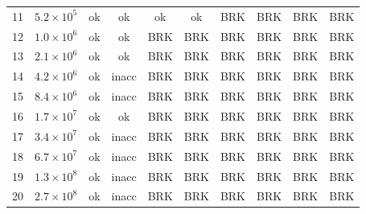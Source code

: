 \begin{tabular}{rr|cc|cc|cc|cc}
11 & $5.2\!\times\!10^{5}$ & \cellcolor{green!15}ok & \cellcolor{green!15}ok & \cellcolor{green!15}ok & \cellcolor{green!15}ok & \cellcolor{red!25}BRK & \cellcolor{red!25}BRK & \cellcolor{red!25}BRK & \cellcolor{red!25}BRK\\
12 & $1.0\!\times\!10^{6}$ & \cellcolor{green!15}ok & \cellcolor{green!15}ok & \cellcolor{red!25}BRK & \cellcolor{red!25}BRK & \cellcolor{red!25}BRK & \cellcolor{red!25}BRK & \cellcolor{red!25}BRK & \cellcolor{red!25}BRK\\
13 & $2.1\!\times\!10^{6}$ & \cellcolor{green!15}ok & \cellcolor{green!15}ok & \cellcolor{red!25}BRK & \cellcolor{red!25}BRK & \cellcolor{red!25}BRK & \cellcolor{red!25}BRK & \cellcolor{red!25}BRK & \cellcolor{red!25}BRK\\
14 & $4.2\!\times\!10^{6}$ & \cellcolor{green!15}ok & \cellcolor{orange!30}inacc & \cellcolor{red!25}BRK & \cellcolor{red!25}BRK & \cellcolor{red!25}BRK & \cellcolor{red!25}BRK & \cellcolor{red!25}BRK & \cellcolor{red!25}BRK\\
15 & $8.4\!\times\!10^{6}$ & \cellcolor{green!15}ok & \cellcolor{orange!30}inacc & \cellcolor{red!25}BRK & \cellcolor{red!25}BRK & \cellcolor{red!25}BRK & \cellcolor{red!25}BRK & \cellcolor{red!25}BRK & \cellcolor{red!25}BRK\\
16 & $1.7\!\times\!10^{7}$ & \cellcolor{green!15}ok & \cellcolor{green!15}ok & \cellcolor{red!25}BRK & \cellcolor{red!25}BRK & \cellcolor{red!25}BRK & \cellcolor{red!25}BRK & \cellcolor{red!25}BRK & \cellcolor{red!25}BRK\\
17 & $3.4\!\times\!10^{7}$ & \cellcolor{green!15}ok & \cellcolor{orange!30}inacc & \cellcolor{red!25}BRK & \cellcolor{red!25}BRK & \cellcolor{red!25}BRK & \cellcolor{red!25}BRK & \cellcolor{red!25}BRK & \cellcolor{red!25}BRK\\
18 & $6.7\!\times\!10^{7}$ & \cellcolor{green!15}ok & \cellcolor{orange!30}inacc & \cellcolor{red!25}BRK & \cellcolor{red!25}BRK & \cellcolor{red!25}BRK & \cellcolor{red!25}BRK & \cellcolor{red!25}BRK & \cellcolor{red!25}BRK\\
19 & $1.3\!\times\!10^{8}$ & \cellcolor{green!15}ok & \cellcolor{orange!30}inacc & \cellcolor{red!25}BRK & \cellcolor{red!25}BRK & \cellcolor{red!25}BRK & \cellcolor{red!25}BRK & \cellcolor{red!25}BRK & \cellcolor{red!25}BRK\\
20 & $2.7\!\times\!10^{8}$ & \cellcolor{green!15}ok & \cellcolor{orange!30}inacc & \cellcolor{red!25}BRK & \cellcolor{red!25}BRK & \cellcolor{red!25}BRK & \cellcolor{red!25}BRK & \cellcolor{red!25}BRK & \cellcolor{red!25}BRK\\

\end{tabular}
